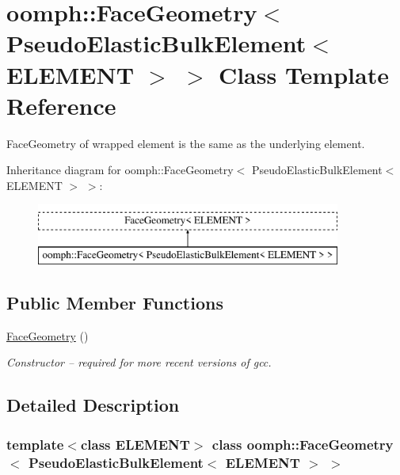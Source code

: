 \hypertarget{classoomph_1_1FaceGeometry_3_01PseudoElasticBulkElement_3_01ELEMENT_01_4_01_4}{}\section{oomph\+:\+:Face\+Geometry$<$ Pseudo\+Elastic\+Bulk\+Element$<$ E\+L\+E\+M\+E\+NT $>$ $>$ Class Template Reference}
\label{classoomph_1_1FaceGeometry_3_01PseudoElasticBulkElement_3_01ELEMENT_01_4_01_4}


Face\+Geometry of wrapped element is the same as the underlying element.  


Inheritance diagram for oomph\+:\+:Face\+Geometry$<$ Pseudo\+Elastic\+Bulk\+Element$<$ E\+L\+E\+M\+E\+NT $>$ $>$\+:\begin{figure}[H]
\begin{center}
\leavevmode
\includegraphics[height=2.000000cm]{classoomph_1_1FaceGeometry_3_01PseudoElasticBulkElement_3_01ELEMENT_01_4_01_4}
\end{center}
\end{figure}
\subsection*{Public Member Functions}
\begin{DoxyCompactItemize}
\item 
\hyperlink{classoomph_1_1FaceGeometry_3_01PseudoElasticBulkElement_3_01ELEMENT_01_4_01_4_a3f79ef40a41543c9d96ef84aecc202f3}{Face\+Geometry} ()
\begin{DoxyCompactList}\small\item\em Constructor -- required for more recent versions of gcc. \end{DoxyCompactList}\end{DoxyCompactItemize}


\subsection{Detailed Description}
\subsubsection*{template$<$class E\+L\+E\+M\+E\+NT$>$\newline
class oomph\+::\+Face\+Geometry$<$ Pseudo\+Elastic\+Bulk\+Element$<$ E\+L\+E\+M\+E\+N\+T $>$ $>$}

